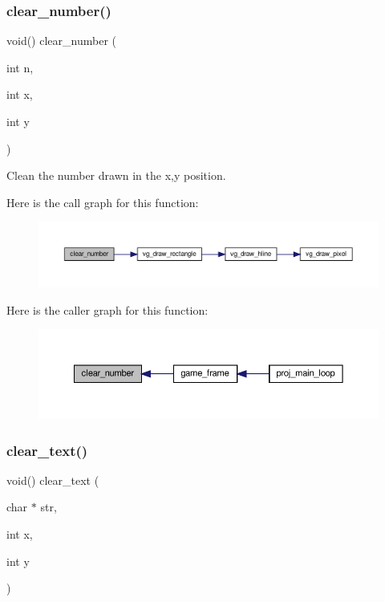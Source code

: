 \subsubsection{\texorpdfstring{clear\+\_\+number()}{clear\_number()}}
{\footnotesize\ttfamily void() clear\+\_\+number (\begin{DoxyParamCaption}\item[{int}]{n,  }\item[{int}]{x,  }\item[{int}]{y }\end{DoxyParamCaption})}



Clean the number drawn in the x,y position. 

Here is the call graph for this function\+:\nopagebreak
\begin{figure}[H]
\begin{center}
\leavevmode
\includegraphics[width=350pt]{group__graphics_ga3a318192b1144825603071c57fdc4b8e_cgraph}
\end{center}
\end{figure}
Here is the caller graph for this function\+:\nopagebreak
\begin{figure}[H]
\begin{center}
\leavevmode
\includegraphics[width=350pt]{group__graphics_ga3a318192b1144825603071c57fdc4b8e_icgraph}
\end{center}
\end{figure}
\mbox{\label{group__graphics_ga51ea06097c3bf68f7963901b0296bde6}} 
\subsubsection{\texorpdfstring{clear\+\_\+text()}{clear\_text()}}
{\footnotesize\ttfamily void() clear\+\_\+text (\begin{DoxyParamCaption}\item[{char $\ast$}]{str,  }\item[{int}]{x,  }\item[{int}]{y }\end{DoxyParamCaption})}



